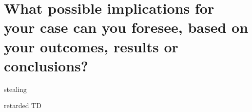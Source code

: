 \section{What possible implications for your case can you foresee, based on your outcomes, results or conclusions?}

stealing

retarded TD